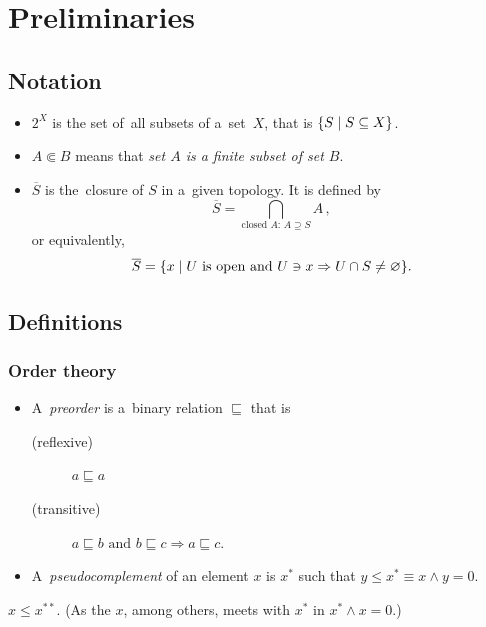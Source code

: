 \chapter{Preliminaries}

\section{Notation}

\begin{itemize}
\item $2^X$ is the set of~all subsets of a~set~$X$, that is $\{ S \mid
S\subseteq X \}$.

\item $A \Subset B$ means that {\sl set $A$ is a finite subset of set $B$\/}.

\item $\overline{S}$ is the~closure of $S$ in a~given topology.
It is defined by
\[
  \overline{S} = \bigcap_{ \text{closed } A\colon \, A\supseteq S} A
  \, ,
\]
or equivalently,
\[
  \overline{S} = \{ x \mid U \text{ is open and } U\owns x \Rightarrow U \cap S
  \ne \varnothing \}.
\]

\end{itemize}

\section{Definitions}

\subsection*{Order theory}

\begin{itemize}
\item A~\emph{preorder} is a~binary relation $\sqsubseteq$ that is
  \begin{description}
  \item[(reflexive)] $a \sqsubseteq a$
  \item[(transitive)] $a \sqsubseteq b \text{ and } b \sqsubseteq c \Rightarrow
  a \sqsubseteq c$.
  \end{description}

\item A~\emph{pseudocomplement} of an element $x$ is $x^*$ such that $y \le x^*
\equiv x \wedge y = 0$.
\end{itemize}

\begin{fact}
  $x \le x^{**}$.
  (As the $x$, among others, meets with $x^*$ in $x^* \wedge x = 0$.)
\end{fact}

